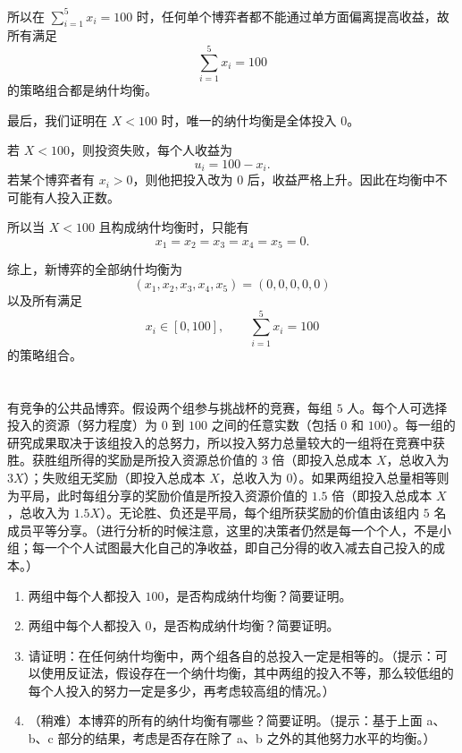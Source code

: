 \documentclass[12pt,a4paper]{article}
\begin{document}
\begin{enumerate}[label=\alph*.]
  所以在 \(\sum_{i=1}^5x_i=100\) 时，任何单个博弈者都不能通过单方面偏离提高收益，故所有满足
  \[
    \sum_{i=1}^5x_i=100
  \]
  的策略组合都是纳什均衡。

  最后，我们证明在 \(X<100\) 时，唯一的纳什均衡是全体投入 \(0\)。

  若 \(X<100\)，则投资失败，每个人收益为
  \[
    u_i=100-x_i.
  \]
  若某个博弈者有 \(x_i>0\)，则他把投入改为 \(0\) 后，收益严格上升。因此在均衡中不可能有人投入正数。

  所以当 \(X<100\) 且构成纳什均衡时，只能有
  \[
    x_1=x_2=x_3=x_4=x_5=0.
  \]

  综上，新博弈的全部纳什均衡为
  \[
    (x_1,x_2,x_3,x_4,x_5)=(0,0,0,0,0)
  \]
  以及所有满足
  \[
    x_i\in[0,100],\qquad \sum_{i=1}^5x_i=100
  \]
  的策略组合。
\end{enumerate}

\section{}
有竞争的公共品博弈。假设两个组参与挑战杯的竞赛，每组 \(5\) 人。每个人可选择投入的资源（努力程度）为 \(0\) 到 \(100\) 之间的任意实数（包括 \(0\) 和 \(100\)）。每一组的研究成果取决于该组投入的总努力，所以投入努力总量较大的一组将在竞赛中获胜。获胜组所得的奖励是所投入资源总价值的 \(3\) 倍（即投入总成本 \(X\)，总收入为 \(3X\)）；失败组无奖励（即投入总成本 \(X\)，总收入为 \(0\)）。如果两组投入总量相等则为平局，此时每组分享的奖励价值是所投入资源价值的 \(1.5\) 倍（即投入总成本 \(X\)，总收入为 \(1.5X\)）。无论胜、负还是平局，每个组所获奖励的价值由该组内 \(5\) 名成员平等分享。（进行分析的时候注意，这里的决策者仍然是每一个个人，不是小组；每一个个人试图最大化自己的净收益，即自己分得的收入减去自己投入的成本。）
\begin{enumerate}[label=\alph*.]
  \item 两组中每个人都投入 \(100\)，是否构成纳什均衡？简要证明。
  \item 两组中每个人都投入 \(0\)，是否构成纳什均衡？简要证明。
  \item 请证明：在任何纳什均衡中，两个组各自的总投入一定是相等的。（提示：可以使用反证法，假设存在一个纳什均衡，其中两组的投入不等，那么较低组的每个人投入的努力一定是多少，再考虑较高组的情况。）
  \item （稍难）本博弈的所有的纳什均衡有哪些？简要证明。（提示：基于上面 a、b、c 部分的结果，考虑是否存在除了 a、b 之外的其他努力水平的均衡。）
\end{enumerate}

\vspace{0.5cm}
\end{document}
